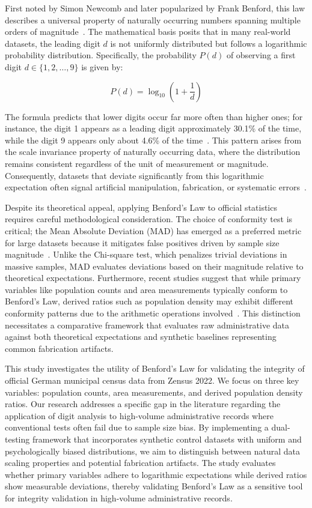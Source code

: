 \documentclass[11pt,a4paper]{article}
\begin{document}
First noted by Simon Newcomb and later popularized by Frank Benford, this law describes a universal property of naturally occurring numbers spanning multiple orders of magnitude~\cite{Miller2015BenfordsLT}. The mathematical basis posits that in many real-world datasets, the leading digit $d$ is not uniformly distributed but follows a logarithmic probability distribution. Specifically, the probability $P(d)$ of observing a first digit $d \in \{1, 2, \dots, 9\}$ is given by:

$$ P(d) = \log_{10}\left(1 + \frac{1}{d}\right) $$

The formula predicts that lower digits occur far more often than higher ones; for instance, the digit 1 appears as a leading digit approximately 30.1\% of the time, while the digit 9 appears only about 4.6\% of the time~\cite{Durtschi2004TheEU}. This pattern arises from the scale invariance property of naturally occurring data, where the distribution remains consistent regardless of the unit of measurement or magnitude. Consequently, datasets that deviate significantly from this logarithmic expectation often signal artificial manipulation, fabrication, or systematic errors~\cite{Petras2025DetectingBL}.

Despite its theoretical appeal, applying Benford's Law to official statistics requires careful methodological consideration. The choice of conformity test is critical; the Mean Absolute Deviation (MAD) has emerged as a preferred metric for large datasets because it mitigates false positives driven by sample size magnitude~\cite{Durtschi2004TheEU}. Unlike the Chi-square test, which penalizes trivial deviations in massive samples, MAD evaluates deviations based on their magnitude relative to theoretical expectations. Furthermore, recent studies suggest that while primary variables like population counts and area measurements typically conform to Benford's Law, derived ratios such as population density may exhibit different conformity patterns due to the arithmetic operations involved~\cite{Druica2018BenfordsLA}. This distinction necessitates a comparative framework that evaluates raw administrative data against both theoretical expectations and synthetic baselines representing common fabrication artifacts.

This study investigates the utility of Benford's Law for validating the integrity of official German municipal census data from Zensus 2022. We focus on three key variables: population counts, area measurements, and derived population density ratios. Our research addresses a specific gap in the literature regarding the application of digit analysis to high-volume administrative records where conventional tests often fail due to sample size bias. By implementing a dual-testing framework that incorporates synthetic control datasets with uniform and psychologically biased distributions, we aim to distinguish between natural data scaling properties and potential fabrication artifacts. The study evaluates whether primary variables adhere to logarithmic expectations while derived ratios show measurable deviations, thereby validating Benford's Law as a sensitive tool for integrity validation in high-volume administrative records.
\end{document}
